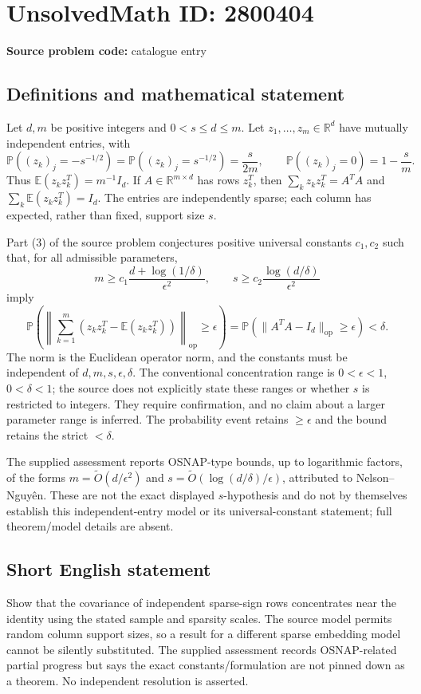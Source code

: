 \documentclass[11pt]{article}
\newcommand{\R}{\mathbb{R}}
\newcommand{\E}{\mathbb{E}}
\begin{document}
\section*{UnsolvedMath ID: 2800404}
\textbf{Source problem code:} catalogue entry
\subsection{Definitions and mathematical statement}
Let $d,m$ be positive integers and $0<s\leq d\leq m$. Let $z_1,\ldots,z_m\in\R^d$ have mutually independent entries, with
\[
 \mathbb P((z_k)_j=-s^{-1/2})=\mathbb P((z_k)_j=s^{-1/2})=\frac{s}{2m},
 \qquad\mathbb P((z_k)_j=0)=1-\frac sm.
\]
Thus $\E(z_kz_k^T)=m^{-1}I_d$. If $A\in\R^{m\times d}$ has rows $z_k^T$, then $\sum_kz_kz_k^T=A^TA$ and $\sum_k\E(z_kz_k^T)=I_d$. The entries are independently sparse; each column has expected, rather than fixed, support size $s$.

Part (3) of the source problem conjectures positive universal constants $c_1,c_2$ such that, for all admissible parameters,
\[
 m\geq c_1\frac{d+\log(1/\delta)}{\epsilon^2},\qquad
 s\geq c_2\frac{\log(d/\delta)}{\epsilon^2}
\]
imply
\[
 \mathbb P\!\left(\left\|\sum_{k=1}^{m}
     (z_kz_k^T-\E(z_kz_k^T))\right\|_{\mathrm{op}}\geq\epsilon\right)
 =\mathbb P(\|A^TA-I_d\|_{\mathrm{op}}\geq\epsilon)<\delta.
\]
The norm is the Euclidean operator norm, and the constants must be independent of $d,m,s,\epsilon,\delta$. The conventional concentration range is $0<\epsilon<1$, $0<\delta<1$; the source does not explicitly state these ranges or whether $s$ is restricted to integers. They require confirmation, and no claim about a larger parameter range is inferred. The probability event retains $\geq\epsilon$ and the bound retains the strict $<\delta$.

The supplied assessment reports OSNAP-type bounds, up to logarithmic factors, of the forms $m=\widetilde O(d/\epsilon^2)$ and $s=\widetilde O(\log(d/\delta)/\epsilon)$, attributed to Nelson--Nguyên. These are not the exact displayed $s$-hypothesis and do not by themselves establish this independent-entry model or its universal-constant statement; full theorem/model details are absent.
\subsection{Short English statement}
Show that the covariance of independent sparse-sign rows concentrates near the identity using the stated sample and sparsity scales. The source model permits random column support sizes, so a result for a different sparse embedding model cannot be silently substituted. The supplied assessment records OSNAP-related partial progress but says the exact constants/formulation are not pinned down as a theorem. No independent resolution is asserted.
\end{document}
